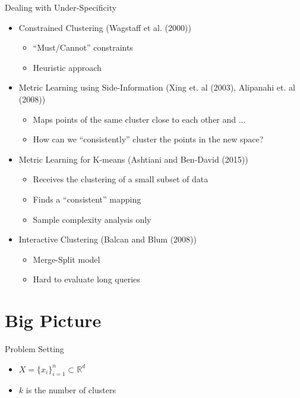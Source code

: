 \documentclass{beamer}
\begin{document}
\begin{frame}{Dealing with Under-Specificity}
  \begin{itemize}
  
    \item Constrained Clustering (Wagstaff et al. (2000))
    \begin{itemize}
        \item ``Must/Cannot'' constraints
        \item Heuristic approach
    \end{itemize}
    
    \pause
    
    \item Metric Learning using Side-Information (Xing et. al (2003), Alipanahi et. al (2008))
        \begin{itemize}
            \item Maps points of the same cluster close to each other and ... 
            \item How can we ``consistently'' cluster the points in the new space?
        \end{itemize}
    \pause
    \item Metric Learning for K-means (Ashtiani and Ben-David (2015))
    \begin{itemize}
        \item Receives the clustering of a small subset of data
        \item Finds a ``consistent'' mapping
        \item Sample complexity analysis only
    \end{itemize}
    \pause
    \item Interactive Clustering (Balcan and Blum (2008))
    \begin{itemize}
        \item Merge-Split model 
        \item Hard to evaluate long queries
    \end{itemize}

  \end{itemize}
\end{frame}



\section{Big Picture}

\begin{frame}{Problem Setting}
  
    
  \begin{itemize}
    \item $X = \{x_i\}_{i=1}^{n} \subset \mathbb{R}^d$
    \item $k$ is the number of clusters

  \end{itemize}
\end{frame}
\end{document}
